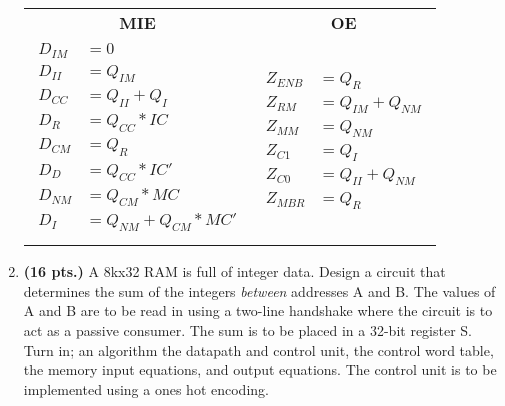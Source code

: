 \begin{enumerate}
\begin{onlysolution}[fragile]
            \begin{tabular}{cc}
                \textbf{MIE}                      & \textbf{OE} \\
                {$
                    \begin{aligned}
                        D_{IM} & = 0                   \\
                        D_{II} & = Q_{IM}              \\
                        D_{CC} & = Q_{II} + Q_{I}      \\
                        D_{R}  & = Q_{CC} * IC         \\
                        D_{CM} & = Q_{R}               \\
                        D_{D}  & = Q_{CC} * IC'        \\
                        D_{NM} & = Q_{CM} * MC         \\
                        D_{I}  & = Q_{NM} + Q_{CM}*MC' \\
                \end{aligned}$} &
                {$
                    \begin{aligned}
                        Z_{ENB} & = Q_{R}            \\
                        Z_{RM}  & = Q_{IM}  + Q_{NM} \\
                        Z_{MM}  & = Q_{NM}           \\
                        Z_{C1}  & = Q_{I}            \\
                        Z_{C0}  & = Q_{II} + Q_{NM}  \\
                        Z_{MBR} & = Q_{R}
                \end{aligned}$}
            \end{tabular}
        \end{onlysolution}
    \item \textbf{ (16 pts.)}
        A 8kx32 RAM is full of integer data.  Design a
        circuit that determines the sum of the integers {\em between} addresses
        A and B.  The values of A and B are to be read in using a two-line
        handshake where the circuit is to act as a passive consumer.
        The sum is to be placed in a 32-bit register S.
        Turn in; an algorithm the datapath and control unit, the control word
        table, the memory input equations, and output equations.
        The control unit is to be implemented using a ones hot encoding.


\end{enumerate}
